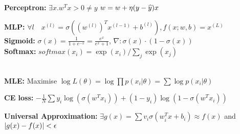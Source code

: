 \textbf{Perceptron:}  $\exists x. w^T x > 0 \neq y$  $w = w + \eta (y - \widehat{y}) x$\\
\begin{comment}
	\Note{If the data is separable, the algorithm converges in finite time} \\
\end{comment}
\textbf{MLP:} $\forall l \quad x^{(l)} = \sigma((w^{(l)})^T x^{(l-1)} + b^{(l)}), f(x;w,b) = x^{(L)}$\\

\textbf{Sigmoid:} $\sigma(x) = \frac{1}{1 + e^{-x}} = \frac{e^x}{e^x + 1}$, $\nabla: \sigma(x) \cdot (1 - \sigma(x))$\\

\textbf{Softmax:} $softmax(x_i) = \exp(x_i) / \sum_j \exp(x_j)$\\
\begin{comment}
	\textbf{Requirements:} 1) Output must be positive \\
	2) output must be between $[0,1]$\\
	3) sum of all outputs must be 1, e.g. $\sum^M_i softmax(x_i) = 1$\\
\end{comment}

\\

\textbf{MLE:} Maximise $\log L(\theta) = \log \prod p(x_i| \theta) = \sum \log p(x_i | \theta)$\\
\begin{comment}
	1) Write down probability distribution\\
	2) Decompose into per sample probability\\
	3) Minimize negative log likelihood\\
\end{comment}

\textbf{CE loss:} $- \frac{1}{N} \sum y_i \log (\sigma(w^T x_i)) + (1 - y_i) \log (1 - \sigma(w^T x_i))$\\
\begin{comment}
	\Note{Cross-entropy loss is a maximum likelihood estimator}
	We assume the y's to be bernoulli distributed, from there we maximise the weights over the probability $P(D|w) = \prod^N \sigma(w^T x_i)^{y_i} (1 - \sigma(w^T x_i))^{1 - y_i}$. 
	Taking the negative log-likelihood results in the given loss.\\
\end{comment}

 \textbf{Universal Approximation:} $\exists g(x) = \sum v_i \sigma(w_i^T x + b_i) \approx f(x)$ and $\left\lvert g(x) - f(x) \right\rvert < \epsilon$\\
 \begin{comment}
 	\Note{$\sigma: \R \rightarrow \R$ must be non-constant, bounded and continous}\\
 	\Note{$f \in [0,1]^m$, e.g. must be in the m-dimensional hypercube}\\
 \end{comment}
 
 

